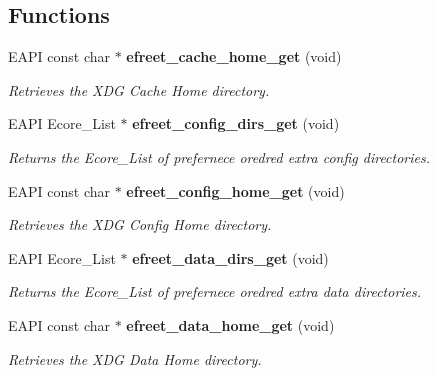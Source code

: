 \subsection*{Functions}
\begin{CompactItemize}
\item 
EAPI const char $\ast$ {\bf efreet\_\-cache\_\-home\_\-get} (void)
\begin{CompactList}\small\item\em Retrieves the XDG Cache Home directory. \item\end{CompactList}\item 
EAPI Ecore\_\-List $\ast$ {\bf efreet\_\-config\_\-dirs\_\-get} (void)
\begin{CompactList}\small\item\em Returns the Ecore\_\-List of prefernece oredred extra config directories. \item\end{CompactList}\item 
EAPI const char $\ast$ {\bf efreet\_\-config\_\-home\_\-get} (void)
\begin{CompactList}\small\item\em Retrieves the XDG Config Home directory. \item\end{CompactList}\item 
EAPI Ecore\_\-List $\ast$ {\bf efreet\_\-data\_\-dirs\_\-get} (void)
\begin{CompactList}\small\item\em Returns the Ecore\_\-List of prefernece oredred extra data directories. \item\end{CompactList}\item 
EAPI const char $\ast$ {\bf efreet\_\-data\_\-home\_\-get} (void)
\begin{CompactList}\small\item\em Retrieves the XDG Data Home directory. \item\end{CompactList}\end{CompactItemize}
